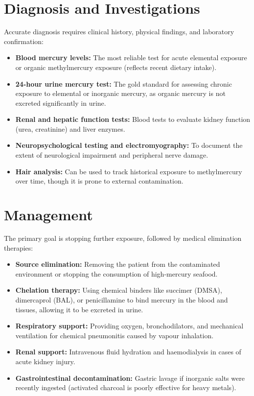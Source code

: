\section*{Diagnosis and Investigations}
Accurate diagnosis requires clinical history, physical findings, and laboratory confirmation:

\begin{itemize}
    \item \textbf{Blood mercury levels:} The most reliable test for acute elemental exposure or organic methylmercury exposure (reflects recent dietary intake).
    \item \textbf{24-hour urine mercury test:} The gold standard for assessing chronic exposure to elemental or inorganic mercury, as organic mercury is not excreted significantly in urine.
    \item \textbf{Renal and hepatic function tests:} Blood tests to evaluate kidney function (urea, creatinine) and liver enzymes.
    \item \textbf{Neuropsychological testing and electromyography:} To document the extent of neurological impairment and peripheral nerve damage.
    \item \textbf{Hair analysis:} Can be used to track historical exposure to methylmercury over time, though it is prone to external contamination.
\end{itemize}

\section*{Management}
The primary goal is stopping further exposure, followed by medical elimination therapies:

\begin{itemize}
    \item \textbf{Source elimination:} Removing the patient from the contaminated environment or stopping the consumption of high-mercury seafood.
    \item \textbf{Chelation therapy:} Using chemical binders like succimer (DMSA), dimercaprol (BAL), or penicillamine to bind mercury in the blood and tissues, allowing it to be excreted in urine.
    \item \textbf{Respiratory support:} Providing oxygen, bronchodilators, and mechanical ventilation for chemical pneumonitis caused by vapour inhalation.
    \item \textbf{Renal support:} Intravenous fluid hydration and haemodialysis in cases of acute kidney injury.
    \item \textbf{Gastrointestinal decontamination:} Gastric lavage if inorganic salts were recently ingested (activated charcoal is poorly effective for heavy metals).
\end{itemize}

